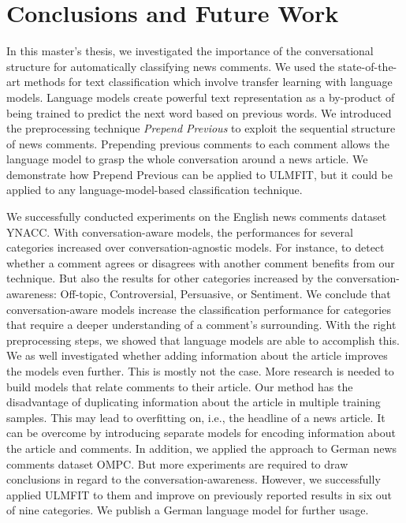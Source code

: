 \chapter{Conclusions and Future Work}
\label{chp:conclusions}

In this master's thesis, we investigated the importance of the conversational structure for automatically classifying news comments.
We used the state-of-the-art methods for text classification which involve transfer learning with language models.
Language models create powerful text representation as a by-product of being trained to predict the next word based on previous words.
We introduced the preprocessing technique \textit{Prepend Previous} to exploit the sequential structure of news comments.
Prepending previous comments to each comment allows the language model to grasp the whole conversation around a news article.
We demonstrate how Prepend Previous can be applied to ULMFIT, but it could be applied to any language-model-based classification technique.

We successfully conducted experiments on the English news comments dataset YNACC.
With conversation-aware models, the performances for several categories increased over conversation-agnostic models.
For instance, to detect whether a comment agrees or disagrees with another comment benefits from our technique.
But also the results for other categories increased by the conversation-awareness: Off-topic, Controversial, Persuasive, or Sentiment.
We conclude that conversation-aware models increase the classification performance for categories that require a deeper understanding of a comment's surrounding.
With the right preprocessing steps, we showed that language models are able to accomplish this.
We as well investigated whether adding information about the article improves the models even further.
This is mostly not the case.
More research is needed to build models that relate comments to their article.
Our method has the disadvantage of duplicating information about the article in multiple training samples.
This may lead to overfitting on, i.e., the headline of a news article.
It can be overcome by introducing separate models for encoding information about the article and comments.
In addition, we applied the approach to German news comments dataset OMPC.
But more experiments are required to draw conclusions in regard to the conversation-awareness.
However, we successfully applied ULMFIT to them and improve on previously reported results in six out of nine categories.
We publish a German language model for further usage.

